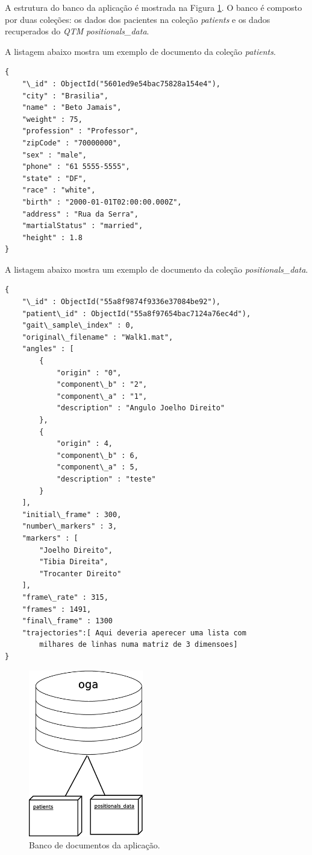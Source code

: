 A estrutura do banco da aplicação é mostrada na Figura \ref{mongo_oga}. 
O banco é composto por duas coleções: os dados dos pacientes na coleção \emph{patients} e os dados recuperados do \emph{QTM} \emph{positionals\_data}.

A listagem abaixo mostra um exemplo de documento da coleção \emph{patients}.
\lstset{language=java}
\begin{lstlisting}[frame=single]
{
	"\_id" : ObjectId("5601ed9e54bac75828a154e4"),
	"city" : "Brasilia",
	"name" : "Beto Jamais",
	"weight" : 75,
	"profession" : "Professor",
	"zipCode" : "70000000",
	"sex" : "male",
	"phone" : "61 5555-5555",
	"state" : "DF",
	"race" : "white",
	"birth" : "2000-01-01T02:00:00.000Z",
	"address" : "Rua da Serra",
	"martialStatus" : "married",
	"height" : 1.8
}
\end{lstlisting}

A listagem abaixo mostra um exemplo de documento da coleção \emph{positionals\_data}.
\lstset{language=java}
\begin{lstlisting}[frame=single]
{
	"\_id" : ObjectId("55a8f9874f9336e37084be92"),
	"patient\_id" : ObjectId("55a8f97654bac7124a76ec4d"),
	"gait\_sample\_index" : 0,
	"original\_filename" : "Walk1.mat",
	"angles" : [
		{
			"origin" : "0",
			"component\_b" : "2",
			"component\_a" : "1",
			"description" : "Angulo Joelho Direito"
		},
		{
			"origin" : 4,
			"component\_b" : 6,
			"component\_a" : 5,
			"description" : "teste"
		}
	],
	"initial\_frame" : 300,
	"number\_markers" : 3,
	"markers" : [
		"Joelho Direito",
		"Tibia Direita",
		"Trocanter Direito"
	],
	"frame\_rate" : 315,
	"frames" : 1491,
	"final\_frame" : 1300
	"trajectories":[ Aqui deveria aperecer uma lista com 
		milhares de linhas numa matriz de 3 dimensoes]
}
\end{lstlisting}

\begin{figure}[ht]
	\centering
	\includegraphics[width=5cm]{figuras/mongo_oga.eps}
	\caption{Banco de documentos da aplicação.}
	\label{mongo_oga}
\end{figure}

